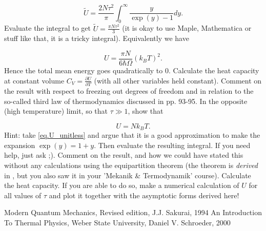 \documentclass[10pt]{article}
\begin{document}
\begin{equation}
\tilde{U} = \frac{2N\tau^2}{\pi}\int_{0}^{\infty}\frac{y}{\exp(y)-1}dy.
\end{equation}
Evaluate the integral to get $\tilde{U} = \frac{\pi N\tau^2}{3}$ (it is okay to use Maple, Mathematica or stuff like that, it is a tricky integral). Equivalently we have

\begin{equation}
U = \frac{\pi N}{6\hbar\Omega}(k_BT)^2. 
\end{equation}
Hence the total mean energy goes quadratically to $0$. Calculate the heat capacity at constant volume $C_V = \frac{\partial U}{\partial T}$ (with all other variables held constant). Comment on the result with respect to freezing out degrees of freedom and in relation to the so-called third law of thermodynamics discussed in \cite{Schroeder} pp. 93-95. In the opposite (high temperature) limit, so that $\tau \gg 1$, show that

\begin{equation}
U = Nk_BT.
\end{equation}
Hint: take \eqref{eq.U_unitless} and argue that it is a good approximation to make the expansion $\exp(y) = 1+y$. Then evaluate the resulting integral. If you need help, just ask ;).  Comment on the result, and how we could have stated this without any calculations using the equipartition theorem (the theorem is \textit{derived} in \cite{Schroeder}, but you also saw it in your 'Mekanik \& Termodynamik' course). Calculate the heat capacity. If you are able to do so, make a numerical calculation of $U$ for all values of $\tau$ and plot it together with the asymptotic forms derived here! \\


\newpage
\begin{thebibliography}{99}
 Modern Quantum Mechanics, Revised edition, J.J. Sakurai,  1994
 An Introduction To Thermal Physics, Weber State University, Daniel V. Schroeder, 2000
\end{thebibliography}
\end{document}
